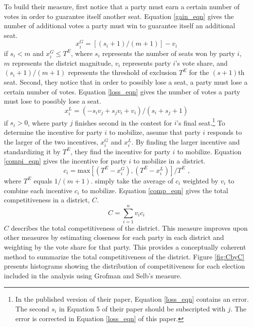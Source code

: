 \documentclass[12pt]{article}
\begin{document}
To build their measure, \cite{GrofmanSelb2009} first notice that a party must earn a certain number of votes in order to guarantee itself another seat. Equation \ref{gain_eqn} gives the number of additional votes a party must win to guarantee itself an additional seat.
\begin{equation}\label{gain_eqn}x^G_i = [(s_i + 1) / (m + 1)] - v_i 
\end{equation}
if $s_i < m$ and $x^G_i \leq T^E$, where $s_i$ represents the number of seats won by party $i$, $m$ represents the district magnitude, $v_i$ represents party $i$'s vote share, and $(s_i + 1)/(m + 1)$ represents the threshold of exclusion $T^E$ for the $(s + 1)$th seat. Second, they notice that in order to possibly lose a seat, a party must lose a certain number of votes. Equation \ref{loss_eqn} gives the number of votes a party must lose to possibly lose a seat.
\begin{equation}\label{loss_eqn}
x^L_i = (-s_iv_j + s_jv_i + v_i)/(s_i + s_j + 1)
\end{equation}
if $s_i >0$, where party $j$ finishes second in the contest for $i$'s final seat.\footnote{In the published version of their paper, Equation \ref{loss_eqn} contains an error. The second $s_i$ in Equation 5 of their paper should be subscripted with $j$. The error is corrected in Equation \ref{loss_eqn} of this paper.} To determine the incentive for party $i$ to mobilize, \cite{GrofmanSelb2009} assume that party $i$ responds to the larger of the two incentives, $x^G_i$ and $x^L_i$. By finding the larger incentive and standardizing it by $T^E$, they find the incentive for party $i$ to mobilize. Equation \ref{compi_eqn} gives the incentive for party $i$ to mobilize in a district.
\begin{equation}\label{compi_eqn}
c_i = \text{max}[(T^E - x^G_i), (T^E - x^L_i)]/T^E \text{ ,}
\end{equation}
where $T^E$ equals $1/(m +1)$. \cite{GrofmanSelb2009} simply take the average of $c_i$ weighted by $v_i$ to combine each incentive $c_i$ to mobilize. Equation \ref{comp_eqn} gives the total competitiveness in a district, $C$.
\begin{equation}\label{comp_eqn}
C = \displaystyle\sum_{i=1}^n v_ic_i
\end{equation}
$C$ describes the total competitiveness of the district. This measure improves upon other measures by estimating closeness for each party in each district and weighting by the vote share for that party. This provides a conceptually coherent method to summarize the total competitiveness of the district. Figure \ref{fig:CbyC} presents histograms showing the distribution of competitiveness for each election included in the analysis using Grofman and Selb's \citeyearpar{GrofmanSelb2009} measure.
\end{document}
